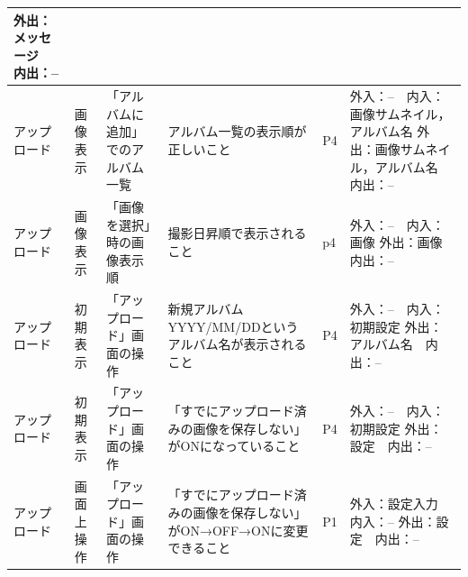 \begin{table}[htbp]
\begin{tabular}{|p{8em}|p{7em}|p{9em}|p{9em}|p{3em}|p{12em}|}
外出：メッセージ　内出：-- \bigstrut\\
    \hline
    アップロード & 画像表示  & \multicolumn{1}{p{7.5em}|}{「アルバムに追加」でのアルバム一覧} & アルバム一覧の表示順が正しいこと & P4    & 外入：--　内入：画像サムネイル，アルバム名
外出：画像サムネイル，アルバム名　内出：-- \bigstrut\\
    \hline
    アップロード & 画像表示  & \multicolumn{1}{p{7.5em}|}{「画像を選択」時の画像表示順} & 撮影日昇順で表示されること & p4    & 外入：--　内入：画像
外出：画像　内出：-- \bigstrut\\
    \hline
    アップロード & 初期表示  & \multicolumn{1}{p{7.5em}|}{「アップロード」画面の操作} & 新規アルバムYYYY/MM/DDというアルバム名が表示されること & P4    & 外入：--　内入：初期設定
外出：アルバム名　内出：-- \bigstrut\\
    \hline
    アップロード & 初期表示  & \multicolumn{1}{p{7.5em}|}{「アップロード」画面の操作} & 「すでにアップロード済みの画像を保存しない」がONになっていること & P4    & 外入：--　内入：初期設定
外出：設定　内出：-- \bigstrut\\
    \hline
    アップロード & 画面上操作 & \multicolumn{1}{p{7.5em}|}{「アップロード」画面の操作} & 「すでにアップロード済みの画像を保存しない」がON→OFF→ONに変更できること & P1    & 外入：設定入力　内入：--
外出：設定　内出：-- \bigstrut\\
    \hline
    \end{tabular}%
  \label{tab:D-4-ER-1}%
\end{table}%

